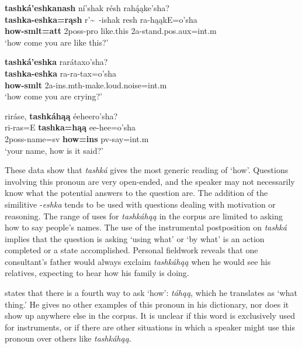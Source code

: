 \begin{exe}
\begin{xlist}
\item\label{ExamplesOfTashka6} \glll \textbf{tashká'eshkanash} ní'shak résh rahą́ąke'sha?\\
    \textbf{tashka-eshka=rąsh} r'\~~-ishak resh ra-hąąkE=o'sha\\
    \textbf{\textnormal{how}-smlt=att} 2poss-pro \textnormal{like.this} 2a-\textnormal{stand}.pos.aux=int.m\\
    \glt `how come you are like this?' \citep[6]{hollow1973a}
    
\item\label{ExamplesOfTashka7} \glll \textbf{tashká'eshka} rarátaxo'sha?\\
    \textbf{tashka-eshka} ra-ra-tax=o'sha\\
    \textbf{\textnormal{how}-smlt} 2a-ins.mth-\textnormal{make.loud.noise}=int.m\\
    \glt `how come you are crying?' \citep[42]{hollow1973a}
    
\item\label{ExamplesOfTashka8} \glll riráse, \textbf{tashkáhąą} éeheero'sha?\\
    ri-ras=E \textbf{tashka=hąą} ee-hee=o'sha\\
    2poss-\textnormal{name}=sv \textbf{\textnormal{how}=ins} pv-\textnormal{say}=int.m\\
    \glt `your name, how is it said?' \citep[20]{hollow1973a}

\end{xlist}

\end{exe}

These data show that \textit{tashká} gives the most generic reading of `how'. Questions involving this pronoun are very open-ended, and the speaker may not necessarily know what the potential answers to the question are. The addition of the similitive -\textit{eshka} tends to be used with questions dealing with motivation or reasoning. The range of uses for \textit{tashkáhąą} in the corpus are limited to asking how to say people's names. The use of the instrumental postposition on \textit{tashká} implies that the question is asking `using what' or `by what' is an action completed or a state accomplished. Personal fieldwork reveals that one consultant's father would always exclaim \textit{tashkáhąą} when he would see his relatives, expecting to hear how his family is doing.

\citet[483]{hollow1970} states that there is a fourth way to ask `how': \textit{táhąą}, which he translates as `what thing.' He gives no other examples of this pronoun in his dictionary, nor does it show up anywhere else in the corpus. It is unclear if this word is exclusively used for instruments, or if there are other situations in which a speaker might use this pronoun over others like \textit{tashkáhąą}.  %

